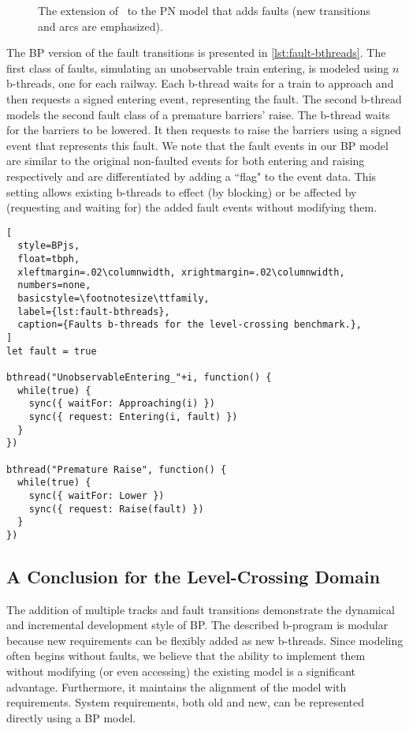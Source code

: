 \documentclass[10pt,journal,compsoc]{IEEEtran}
\theoremstyle{definition}
\begin{document}
\begin{figure}
  \centering
{}
  \caption{The extension of~\cite{ghazel2016customizable} to the PN model that adds faults (new transitions and arcs are emphasized).}
  \label{fig:ghazel-fault} 
\end{figure}

The BP version of the fault transitions is presented in \autoref{lst:fault-bthreads}. The first class of faults, simulating an unobservable train entering, is modeled using $n$ b-threads, one for each railway. Each b-thread waits for a train to approach and then requests a signed entering event, representing the fault. The second b-thread models the second fault class of a premature barriers' raise. The b-thread waits for the barriers to be lowered. It then requests to raise the barriers using a signed event that represents this fault. We note that the fault events in our BP model are similar to the original non-faulted events for both entering and raising respectively and are differentiated by adding a ``flag" to the event data. This setting allows existing b-threads to effect (by blocking) or be affected by (requesting and waiting for) the added fault events without modifying them. 


\begin{lstlisting}[
  style=BPjs,
  float=tbph,
  xleftmargin=.02\columnwidth, xrightmargin=.02\columnwidth,
  numbers=none,
  basicstyle=\footnotesize\ttfamily,
  label={lst:fault-bthreads},
  caption={Faults b-threads for the level-crossing benchmark.},
]
let fault = true

bthread("UnobservableEntering_"+i, function() {
  while(true) {
    sync({ waitFor: Approaching(i) })
    sync({ request: Entering(i, fault) })
  }
})

bthread("Premature Raise", function() {
  while(true) {
    sync({ waitFor: Lower })
    sync({ request: Raise(fault) })
  }
})
\end{lstlisting}

\subsection{A Conclusion for the Level-Crossing Domain}
The addition of multiple tracks and fault transitions demonstrate the dynamical and incremental development style of BP. The described b-program is modular because new requirements can be flexibly added as new b-threads. Since modeling often begins without faults, we believe that the ability to implement them without modifying (or even accessing) the existing model is a significant advantage. Furthermore, it maintains the alignment of the model with requirements. System requirements, both old and new, can be represented directly using a BP model. 
\end{document}
